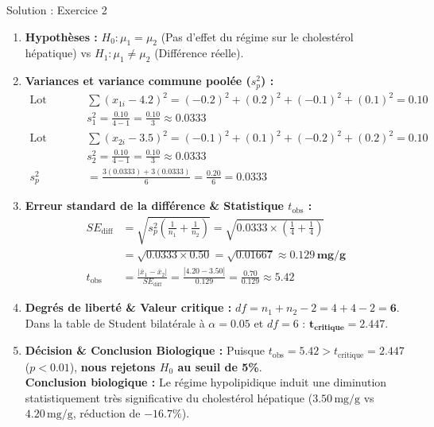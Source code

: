 \documentclass[11pt,a4paper]{article}
\begin{document}
\begin{solutionbox}{Solution : Exercice 2}
\begin{enumerate}[label=\textbf{\alph*.}]
  \item \textbf{Hypothèses :}
  $H_0 : \mu_1 = \mu_2$ (Pas d'effet du régime sur le cholestérol hépatique) vs $H_1 : \mu_1 \neq \mu_2$ (Différence réelle).
  \item \textbf{Variances et variance commune poolée ($s_p^2$) :}
  \begin{align*}
    \text{Lot Témoin :} \quad & \sum (x_{1i} - 4.2)^2 = (-0.2)^2 + (0.2)^2 + (-0.1)^2 + (0.1)^2 = 0.10 \\
    & s_1^2 = \frac{0.10}{4 - 1} = \frac{0.10}{3} \approx 0.0333 \\[1mm]
    \text{Lot Traité :} \quad & \sum (x_{2i} - 3.5)^2 = (-0.1)^2 + (0.1)^2 + (-0.2)^2 + (0.2)^2 = 0.10 \\
    & s_2^2 = \frac{0.10}{4 - 1} = \frac{0.10}{3} \approx 0.0333 \\[2mm]
    s_p^2 &= \frac{3(0.0333) + 3(0.0333)}{6} = \frac{0.20}{6} = \mathbf{0.0333}
  \end{align*}
  \item \textbf{Erreur standard de la différence \& Statistique $t_{\text{obs}}$ :}
  \begin{align*}
    SE_{\text{diff}} &= \sqrt{s_p^2 \left(\frac{1}{n_1} + \frac{1}{n_2}\right)} = \sqrt{0.0333 \times \left(\frac{1}{4} + \frac{1}{4}\right)} \\
    &= \sqrt{0.0333 \times 0.50} = \sqrt{0.01667} \approx \mathbf{0.129\,\text{mg/g}} \\[2mm]
    t_{\text{obs}} &= \frac{|\bar{x}_1 - \bar{x}_2|}{SE_{\text{diff}}} = \frac{|4.20 - 3.50|}{0.129} = \frac{0.70}{0.129} \approx \mathbf{5.42}
  \end{align*}
  \item \textbf{Degrés de liberté \& Valeur critique :}
  $df = n_1 + n_2 - 2 = 4 + 4 - 2 = \mathbf{6}$.\\
  Dans la table de Student bilatérale à $\alpha = 0.05$ et $df = 6$ : $\mathbf{t_{\text{critique}} = 2.447}$.
  \item \textbf{Décision \& Conclusion Biologique :}
  Puisque $t_{\text{obs}} = 5.42 > t_{\text{critique}} = 2.447$ ($p < 0.01$), \textbf{nous rejetons $H_0$ au seuil de 5\%}.\\
  \textbf{Conclusion biologique :} Le régime hypolipidique induit une diminution statistiquement très significative du cholestérol hépatique ($3.50\,\text{mg/g}$ vs $4.20\,\text{mg/g}$, réduction de $-16.7\%$).
\end{enumerate}
\end{solutionbox}
\end{document}
